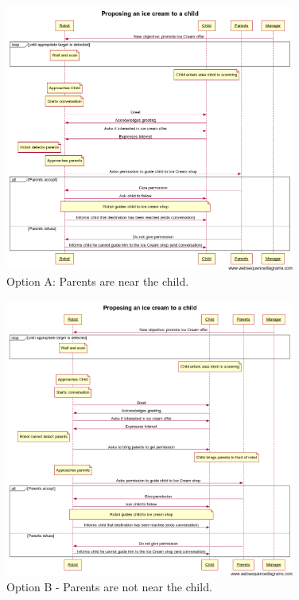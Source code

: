 \begin{figure}[!h]
\includegraphics[width=0.85\textwidth]{iceCreamA}
\protect\caption{Option A: Parents are near the child.}
\end{figure}


\begin{figure}[!h]
\includegraphics[width=0.85\textwidth]{iceCreamB}
\protect\caption{Option B - Parents are not near the child.}
\end{figure}




